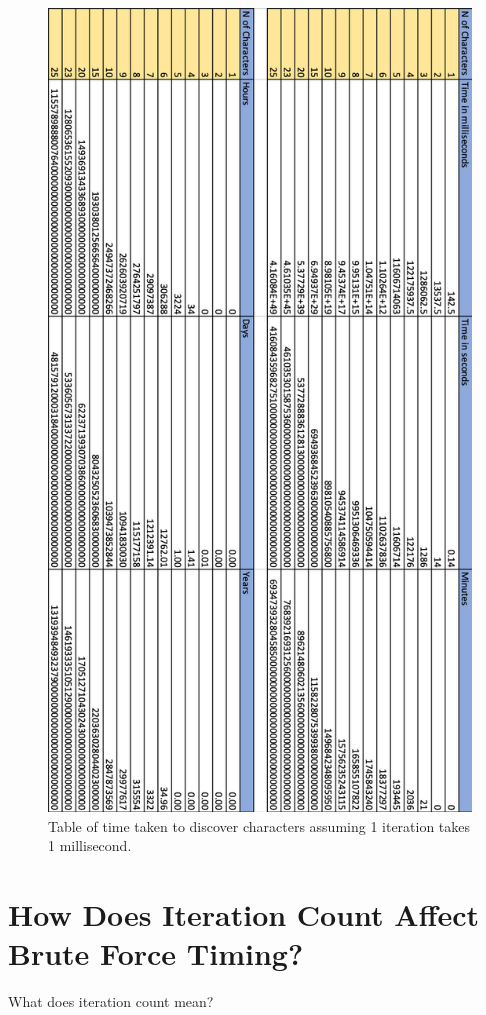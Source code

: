 \documentclass[a4paper, twoside, 11pt]{article}
\begin{document}
\begin{figure}[H]
	\centering
	\includegraphics[scale=0.9]{Images/timeEstimationImage.png}
	\caption{Table of time taken to discover characters assuming 1 iteration takes 1 millisecond.}
\end{figure}

\section{How Does Iteration Count Affect Brute Force Timing?}
What does iteration count mean?
\end{document}
